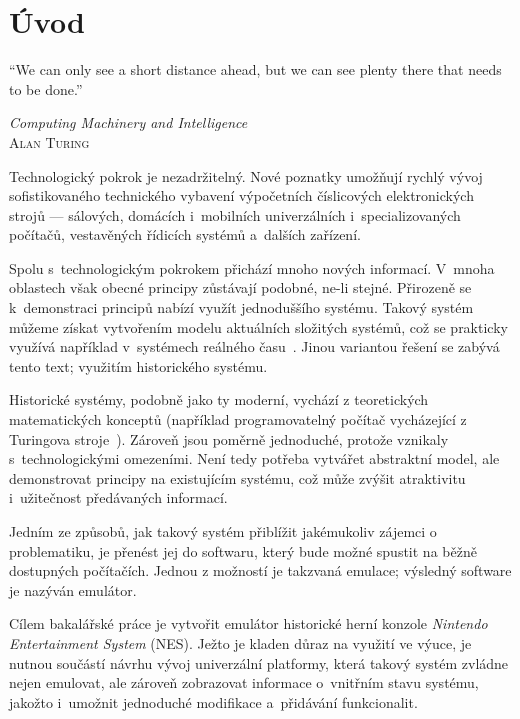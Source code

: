\chapter*{Úvod}
\setcounter{page}{1}

\epigraph{
	\enquote{We can only see a short distance ahead, but we can see plenty there that needs to be done.}
}{\textit{Computing Machinery and Intelligence}\\ \textsc{Alan Turing}}

Technologický pokrok je nezadržitelný. Nové poznatky umožňují rychlý vývoj sofistikovaného technického vybavení výpočetních číslicových elektronických strojů --- sálových, domácích i~mobilních univerzálních i~specializovaných počítačů, vestavěných řídicích systémů a~dalších zařízení.

Spolu s~technologickým pokrokem přichází mnoho nových informací. V~mnoha oblastech však obecné principy zůstávají podobné, ne-li stejné. Přirozeně se  k~demonstraci principů nabízí využít jednoduššího systému. Takový systém můžeme získat vytvořením modelu aktuálních složitých systémů, což se prakticky využívá například v~systémech reálného času~\cite{Kubatova2019:src-modely}. Jinou variantou řešení se zabývá tento text; využitím historického systému.

Historické systémy, podobně jako ty moderní, vychází z teoretických matematických konceptů (například programovatelný počítač vycházející z Turingova stroje~\cite{Teuscher2003:turing}). Zároveň jsou poměrně jednoduché, protože vznikaly s~technologickými omezeními. Není tedy potřeba vytvářet abstraktní model, ale demonstrovat principy na existujícím systému, což může zvýšit atraktivitu i~užitečnost předávaných informací.

Jedním ze způsobů, jak takový systém přiblížit jakémukoliv zájemci o problematiku, je přenést jej do softwaru, který bude možné spustit na běžně dostupných počítačích. Jednou z možností je takzvaná emulace; výsledný software je nazýván emulátor.

Cílem bakalářské práce je vytvořit emulátor historické herní konzole \emph{Nintendo Entertainment System} (NES). Ježto je kladen důraz na využití ve výuce, je nutnou součástí návrhu vývoj univerzální platformy, která takový systém zvládne nejen emulovat, ale zároveň zobrazovat informace o~vnitřním stavu systému, jakožto i~umožnit jednoduché modifikace a~přidávání funkcionalit.


